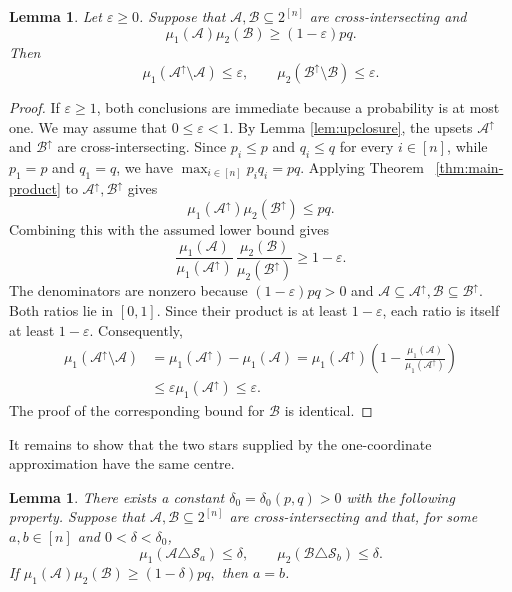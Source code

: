 \documentclass[11pt]{article}
\numberwithin{equation}{section}
\newtheorem{lemma}[theorem]{Lemma}
\theoremstyle{definition}
\theoremstyle{remark}
\begin{document}
\begin{lemma}\label{lem:upset-cost}
Let $\varepsilon\geq0$. Suppose that
$\mathcal A,\mathcal B\subseteq2^{[n]}$ are cross-intersecting and
$$
\mu_1(\mathcal A)\mu_2(\mathcal B)
\geq
(1-\varepsilon)pq.
$$
Then
$$
\mu_1(\mathcal A^\uparrow\setminus\mathcal A)
\leq
\varepsilon,
\qquad
\mu_2(\mathcal B^\uparrow\setminus\mathcal B)
\leq
\varepsilon.
$$
\end{lemma}

\begin{proof}
If $\varepsilon\geq1$, both conclusions are immediate because a
probability is at most one. We may  assume that
$
0\leq\varepsilon<1.
$
By Lemma \ref{lem:upclosure}, the upsets $\mathcal A^\uparrow$ and
$\mathcal B^\uparrow$ are cross-intersecting. Since
$p_i\leq p$ and $q_i\leq q$ for every $i\in[n]$, while
$p_1=p$ and $q_1=q$, we have
$
\max_{i\in[n]}p_iq_i=pq.
$
Applying Theorem~ \ref{thm:main-product} to
$\mathcal A^\uparrow,\mathcal B^\uparrow$ gives
$$
\mu_1(\mathcal A^\uparrow)
\mu_2(\mathcal B^\uparrow)
\leq pq.
$$
Combining this with the assumed lower bound gives
$$
\frac{\mu_1(\mathcal A)}
     {\mu_1(\mathcal A^\uparrow)}
\,
\frac{\mu_2(\mathcal B)}
     {\mu_2(\mathcal B^\uparrow)}
\geq
1-\varepsilon.
$$
The denominators are nonzero because
$(1-\varepsilon)pq>0$ and
$
\mathcal A\subseteq\mathcal A^\uparrow,
\mathcal B\subseteq\mathcal B^\uparrow.
$
Both ratios lie in $[0,1]$. Since their product is at least
$1-\varepsilon$, each ratio is itself at least $1-\varepsilon$.
Consequently,
$$
\begin{aligned}
\mu_1(\mathcal A^\uparrow\setminus\mathcal A)
&=
\mu_1(\mathcal A^\uparrow)-\mu_1(\mathcal A)=
\mu_1(\mathcal A^\uparrow)
\left(
1-
\frac{\mu_1(\mathcal A)}
     {\mu_1(\mathcal A^\uparrow)}
\right)\\
&\leq
\varepsilon\mu_1(\mathcal A^\uparrow)\leq
\varepsilon.
\end{aligned}
$$
The proof of the corresponding bound for $\mathcal B$ is identical.
\end{proof}

It remains to show that the two stars supplied by the
one-coordinate approximation have the same centre.

\begin{lemma}\label{lem:star-alignment}
There exists a constant $\delta_0=\delta_0(p,q)>0$ with the
following property. Suppose that
$\mathcal A,\mathcal B\subseteq2^{[n]}$ are cross-intersecting and
that, for some $a,b\in[n]$ and $0<\delta<\delta_0$,
$$
\mu_1(\mathcal A\triangle\mathcal S_a)\leq\delta,
\qquad
\mu_2(\mathcal B\triangle\mathcal S_b)\leq\delta.
$$
If
$
\mu_1(\mathcal A)\mu_2(\mathcal B)
\geq
(1-\delta)pq,
$
then $a=b$.
\end{lemma}
\end{document}
